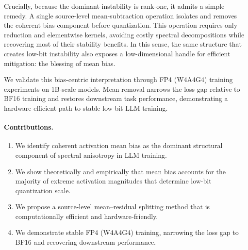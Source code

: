 Crucially, because the dominant instability is rank-one, it admits a simple remedy. A single source-level mean-subtraction operation isolates and removes the coherent bias component before quantization. This operation requires only reduction and elementwise kernels, avoiding costly spectral decompositions while recovering most of their stability benefits. In this sense, the same structure that creates low-bit instability also exposes a low-dimensional handle for efficient mitigation: the blessing of mean bias.

We validate this bias-centric interpretation through FP4 (W4A4G4) training experiments on 1B-scale models. Mean removal narrows the loss gap relative to BF16 training and restores downstream task performance, demonstrating a hardware-efficient path to stable low-bit LLM training.

\paragraph{Contributions.}
\begin{enumerate}
    \item We identify coherent activation mean bias as the dominant structural component of spectral anisotropy in LLM training.
    \item We show theoretically and empirically that mean bias accounts for the majority of extreme activation magnitudes that determine low-bit quantization scale.
    \item We propose a source-level mean–residual splitting method that is computationally efficient and hardware-friendly.
    \item We demonstrate stable FP4 (W4A4G4) training, narrowing the loss gap to BF16 and recovering downstream performance.
\end{enumerate}